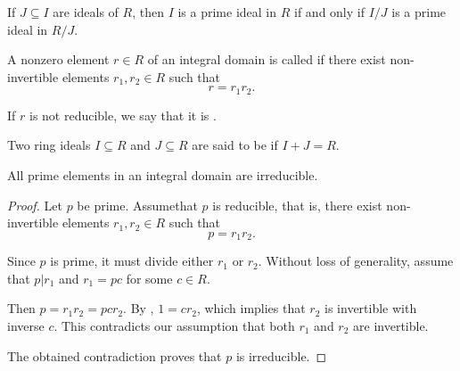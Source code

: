 \begin{proposition}\label{thm:prime_ideal_iff_prime_quotient_ideal}
  If \( J \subseteq I \) are ideals of \( R \), then \( I \) is a prime ideal in \( R \) if and only if \( I / J \) is a prime ideal in  \( R / J \).
\end{proposition}

\begin{definition}\label{def:irreducible_ring_element}
  A nonzero element \( r \in R \) of an integral domain is called  if there exist non-invertible elements \( r_1, r_2 \in R \) such that
  \begin{equation*}
    r = r_1 r_2.
  \end{equation*}

  If \( r \) is not reducible, we say that it is .
\end{definition}

\begin{definition}\label{def:coprime_ring_ideals}
  Two ring ideals \( I \subseteq R \) and \( J \subseteq R \) are said to be  if \( I + J = R \).
\end{definition}

\begin{proposition}\label{thm:prime_implies_irreducible}\cite[389]{Knapp2016BAlg}
  All prime elements in an integral domain are irreducible.
\end{proposition}
\begin{proof}
  Let \( p \) be prime. Assume\LEM that \( p \) is reducible, that is, there exist non-invertible elements \( r_1, r_2 \in R \) such that
  \begin{equation*}
    p = r_1 r_2.
  \end{equation*}

  Since \( p \) is prime, it must divide either \( r_1 \) or \( r_2 \). Without loss of generality, assume that \( p | r_1 \) and \( r_1 = pc \) for some \( c \in R \).

  Then \( p = r_1 r_2 = pc r_2 \). By , \( 1 = c r_2 \), which implies that \( r_2 \) is invertible with inverse \( c \). This contradicts our assumption that both \( r_1 \) and \( r_2 \) are invertible.

  The obtained contradiction proves that \( p \) is irreducible.
\end{proof}

